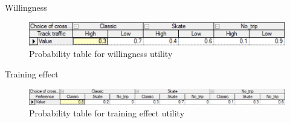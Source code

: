 \documentclass{article}
\begin{document}
\newpage

Willingness

\begin{figure}[h]
    \centering
    \includegraphics[width=\linewidth]{willingness.png}
    \caption{Probability table for willingness utility}
    \label{fig:image5}
\end{figure}

Training effect

\begin{figure}[h]
    \centering
    \includegraphics[width=\linewidth]{training_effect.png}
    \caption{Probability table for training effect utility}
    \label{fig:image6}
\end{figure}
\end{document}
